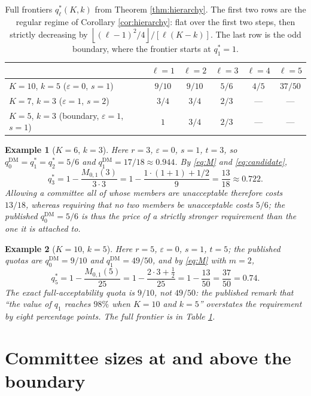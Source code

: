 \documentclass[11pt]{article}
\theoremstyle{plain}
\newtheorem{example}{Example}
\theoremstyle{definition}
\newcommand{\fl}[1]{\left\lfloor #1\right\rfloor}
\newcommand{\eps}{\varepsilon}
\newcommand{\DM}{\mathrm{DM}}
\begin{document}
\begin{table}[htbp]
\centering
\small
\begin{tabular}{lccccc}
\toprule
& $\ell=1$ & $\ell=2$ & $\ell=3$ & $\ell=4$ & $\ell=5$\\
\midrule
$K=10$, $k=5$ ($\eps=0$, $s=1$) & $9/10$ & $9/10$ & $5/6$ & $4/5$ & $37/50$\\
$K=7$, $k=3$ ($\eps=1$, $s=2$) & $3/4$ & $3/4$ & $2/3$ & --- & ---\\
$K=5$, $k=3$ (boundary, $\eps=1$, $s=1$) & $1$ & $3/4$ & $2/3$ & --- & ---\\
\bottomrule
\end{tabular}
\caption{Full frontiers $q_\ell^*(K,k)$ from Theorem \ref{thm:hierarchy}. The first two rows are the regular regime of Corollary \ref{cor:hierarchy}: flat over the first two steps, then strictly decreasing by $\fl{(\ell-1)^2/4}/[\ell(K-k)]$. The last row is the odd boundary, where the frontier starts at $q_1^*=1$.}
\label{tab:frontier}
\end{table}

\begin{example}[$K=6$, $k=3$]
\label{ex:K6k3}
Here $r=3$, $\eps=0$, $s=1$, $t=3$, so $q_0^{\DM}=q_1^*=q_2^*=5/6$ and $q_1^{\DM}=17/18\approx0.944$. By \eqref{eq:M} and \eqref{eq:candidate},
\[
q_3^*=1-\frac{M_{0,1}(3)}{3\cdot3}=1-\frac{1\cdot(1+1)+1/2}{9}=\frac{13}{18}\approx0.722 .
\]
Allowing a committee all of whose members are unacceptable therefore costs $13/18$, whereas requiring that no two members be unacceptable costs $5/6$; the published $q_0^{\DM}=5/6$ is thus the price of a strictly stronger requirement than the one it is attached to.
\end{example}

\begin{example}[$K=10$, $k=5$]
\label{ex:K10k5}
Here $r=5$, $\eps=0$, $s=1$, $t=5$; the published quotas are $q_0^{\DM}=9/10$ and $q_1^{\DM}=49/50$, and by \eqref{eq:M} with $m=2$,
\[
q_5^*=1-\frac{M_{0,1}(5)}{25}=1-\frac{2\cdot3+\tfrac12}{25}=1-\frac{13}{50}=\frac{37}{50}=0.74 .
\]
The exact full-acceptability quota is $9/10$, not $49/50$: the published remark that ``the value of $q_1$ reaches $98\%$ when $K=10$ and $k=5$'' \cite[p.~17]{DissMahajne2020} overstates the requirement by eight percentage points. The full frontier is in Table \ref{tab:frontier}.
\end{example}

\section{Committee sizes at and above the boundary}
\label{sec:boundary}
\end{document}
